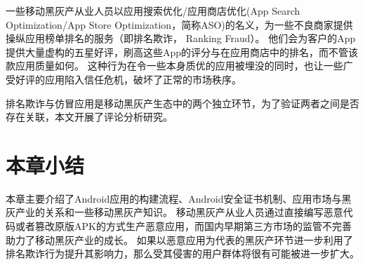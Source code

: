 一些移动黑灰产从业人员以应用搜索优化/应用商店优化(App Search Optimization/App Store Optimization，简称ASO)的名义，为一些不良商家提供操纵应用榜单排名的服务（即排名欺诈， Ranking Fraud）。
他们会为客户的App提供大量虚构的五星好评，刷高这些App的评分与在应用商店中的排名，而不管该款应用质量如何。
这种行为在令一些本身质优的应用被埋没的同时，也让一些广受好评的应用陷入信任危机，破坏了正常的市场秩序。

排名欺诈与仿冒应用是移动黑灰产生态中的两个独立环节，为了验证两者之间是否存在关联，本文开展了评论分析研究。

\section{本章小结}
本章主要介绍了Android应用的构建流程、Android安全证书机制、应用市场与黑灰产业的关系和一些移动黑灰产知识。
移动黑灰产从业人员通过直接编写恶意代码或者篡改原版APK的方式生产恶意应用，而国内早期第三方市场的监管不完善助力了移动黑灰产业的成长。
如果以恶意应用为代表的黑灰产环节进一步利用了排名欺诈行为提升其影响力，那么受其侵害的用户群体将很有可能被进一步扩大。
